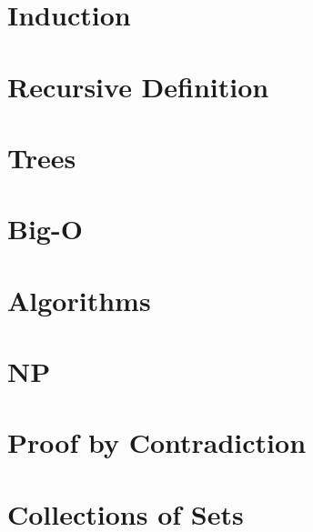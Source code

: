 \documentclass{article}
\begin{document}
\section{Induction}


\section{Recursive Definition}


\section{Trees}


\section{Big-O}


\section{Algorithms}


\section{NP}


\section{Proof by Contradiction}


\section{Collections of Sets}

\end{document}
